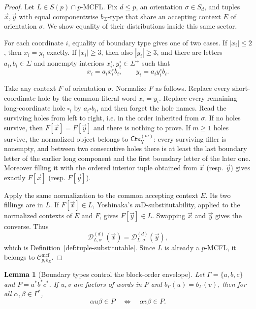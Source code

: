 \documentclass[11pt,a4paper]{article}
\numberwithin{equation}{section}
\theoremstyle{plain}
\newtheorem{lemma}[theorem]{Lemma}
\theoremstyle{definition}
\theoremstyle{remark}
\newcommand{\Cmcf}[2]{\mathcal{C}^{\mathrm{mcf}}_{#1,#2}}
\newcommand{\D}{\mathcal{D}}
\newcommand{\tuple}[1]{\vec{#1}}
\newcommand{\blank}{\square}
\begin{document}
\begin{proof}
Let \(L\in S(p)\cap p\text{-}\mathrm{MCFL}\).  Fix \(d\le p\), an
orientation \(\sigma\in S_d\), and tuples \(\tuple x,\tuple y\) with equal
componentwise \(b_\Sigma\)-type that share an accepting context \(E\) of
orientation \(\sigma\).  We show equality of their distributions inside this
same sector.

For each coordinate \(i\), equality of boundary type gives one of two cases.
If \(|x_i|\le2\), then \(x_i=y_i\) exactly.  If \(|x_i|\ge3\), then also
\(|y_i|\ge3\), and there are letters \(a_i,b_i\in\Sigma\) and nonempty
interiors \(x_i^\circ,y_i^\circ\in\Sigma^+\) such that
\[
  x_i=a_i x_i^\circ b_i,
  \qquad
  y_i=a_i y_i^\circ b_i.
\]

Take any context \(F\) of orientation \(\sigma\).  Normalize \(F\) as
follows.  Replace every short-coordinate hole by the common literal word
\(x_i=y_i\).  Replace every remaining long-coordinate hole \(\blank_i\) by
\(a_i\blank b_i\), and then forget the hole names.  Read the surviving holes
from left to right, i.e. in the order inherited from \(\sigma\).  If no holes
survive, then \(F[\tuple x]=F[\tuple y]\) and there is nothing to prove.  If
\(m\ge1\) holes survive, the normalized object belongs to
\(\mathsf{Ctx}_{\mathrm Y}^{(m)}\): every surviving filler is nonempty, and
between two consecutive holes there is at least the last boundary letter of
the earlier long component and the first boundary letter of the later one.
Moreover filling it with the ordered interior tuple obtained from \(\tuple x\)
(resp. \(\tuple y\)) gives exactly \(F[\tuple x]\) (resp. \(F[\tuple y]\)).

Apply the same normalization to the common accepting context \(E\).  Its two
fillings are in \(L\).  If \(F[\tuple x]\in L\), Yoshinaka's
\(m\)D-substitutability, applied to the normalized contexts of \(E\) and
\(F\), gives \(F[\tuple y]\in L\).  Swapping \(\tuple x\) and \(\tuple y\)
gives the converse.  Thus
\[
  \D_{L,\sigma}^{(d)}(\tuple x)
  =\D_{L,\sigma}^{(d)}(\tuple y),
\]
which is Definition~\ref{def:tuple-substitutable}.  Since \(L\) is already a
\(p\)-MCFL, it belongs to \(\Cmcf{p}{b_\Sigma}\).
\end{proof}

\begin{lemma}[Boundary types control the block-order envelope]
\label{lem:block-order-boundary-control}
Let $\Gamma=\{a,b,c\}$ and $P=a^*b^*c^*$.  If $u,v$ are factors of words in
$P$ and $b_\Gamma(u)=b_\Gamma(v)$, then for all $\alpha,\beta\in\Gamma^*$,
\[
  \alpha u\beta\in P
  \quad\Longleftrightarrow\quad
  \alpha v\beta\in P.
\]
\end{lemma}
\end{document}
